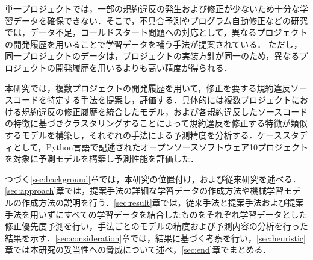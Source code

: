 \documentclass[T,J]{fose} %
\begin{document}
単一プロジェクトでは，一部の規約違反の発生および修正が少ないため十分な学習データを確保できない．そこで，不具合予測やプログラム自動修正などの研究では，データ不足，コールドスタート問題への対応として，異なるプロジェクトの開発履歴を用いることで学習データを補う手法が提案されている\cite{Tabassum}．
ただし，同一プロジェクトのデータは，プロジェクトの実装方針が同一のため，異なるプロジェクトの開発履歴を用いるよりも高い精度が得られる．

本研究では，複数プロジェクトの開発履歴を用いて，修正を要する規約違反ソースコードを特定する手法を提案し，評価する．具体的には複数プロジェクトにおける規約違反の修正履歴を統合したモデル，および各規約違反したソースコードの特徴に基づきクラスタリングすることによって規約違反を修正する特徴が類似するモデルを構築し，それぞれの手法による予測精度を分析する．ケーススタディとして，Python言語で記述されたオープンソースソフトウェア10プロジェクトを対象に予測モデルを構築し予測性能を評価した．

つづく\ref{sec:background}章では，本研究の位置付け，および従来研究を述べる．\ref{sec:approach}章では，提案手法の詳細な学習データの作成方法や機械学習モデルの作成方法の説明を行う．\ref{sec:result}章では，従来手法と提案手法および提案手法を用いずにすべての学習データを結合したものをそれぞれ学習データとした修正優先度予測を行い，手法ごとのモデルの精度および予測内容の分析を行った結果を示す．\ref{sec:consideration}章では，結果に基づく考察を行い，\ref{sec:heuristic}章では本研究の妥当性への脅威について述べ，\ref{sec:end}章でまとめる．



\end{document}
